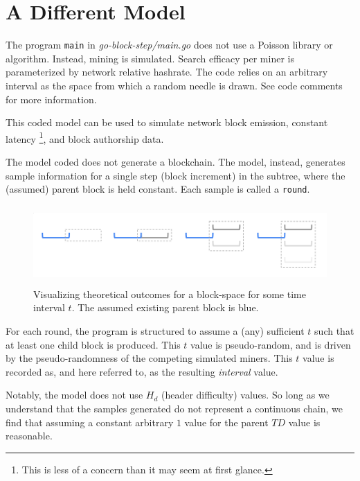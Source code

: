 \documentclass[11pt]{article}
\theoremstyle{plain}
\begin{document}

\section{\normalsize{A Different Model}}

The program \texttt{main} in \textit{go-block-step/main.go} does not use
a Poisson library or algorithm.
Instead, mining is simulated.
Search efficacy per miner is parameterized by network relative hashrate.
The code relies on an arbitrary interval as the space from which a random needle
is drawn. See code comments for more information.

This coded model can be used to simulate network block emission, constant latency\nolinebreak
\footnote{This is less of a concern than it may seem at first glance.}, and
block authorship data.

The model coded does not generate a blockchain. The model, instead,
generates sample information for a single step (block increment)
in the subtree, where the (assumed) parent block is held constant.
Each sample is called a \texttt{round}.

\begin{figure}[tph]
    \centering
    \includegraphics[height=3cm]{vis_theoretical_block-space.png}
    \caption{
        Visualizing theoretical outcomes for a block-space for some time interval
        $t$. The assumed existing parent block is blue.
    }
\end{figure}

For each round, the program is structured to assume a (any) sufficient $t$ such
that at least one child block is produced. This $t$ value is pseudo-random, and
is driven by the pseudo-randomness of the competing simulated miners.
This $t$ value is recorded as, and here referred to, as the resulting
\textit{interval} value.

Notably, the model does not use $H_d$ (header difficulty) values.
So long as we understand that the samples generated do not represent a continuous
chain, we find that assuming a constant arbitrary $1$ value for the
parent $TD$ value is reasonable.
\end{document}
